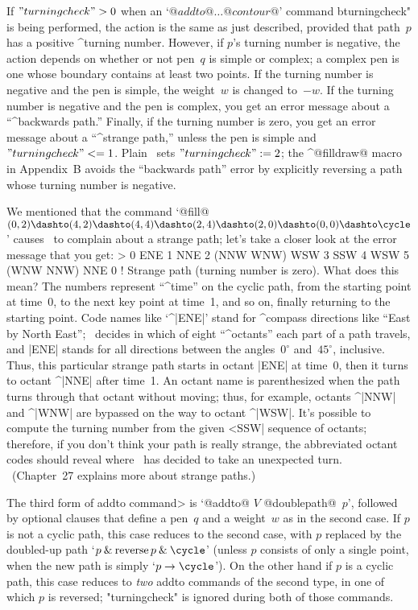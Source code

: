 {{{{\ddanger If $"turningcheck">0$ when an `$@addto@\ldots@contour@$' command
^^"turningcheck" is being performed, the action is the same as just
described, provided that path~$p$ has a positive ^{turning number}.
However, if $p$'s turning number is negative, the action depends on
whether or not pen~$q$ is simple or complex; a complex pen is one whose
boundary contains at least two points. If the turning number is negative
and the pen is simple, the weight~$w$ is changed to~$-w$. If the turning
number is negative and the pen is complex, you get an error message about
a ``^{backwards path}.''  Finally, if the turning number is zero, you get
an error message about a ``^{strange path},'' unless the pen is simple and
$"turningcheck"<=1$.  Plain \MF\ sets $"turningcheck":=2$; the ^@filldraw@
macro in Appendix~B avoids the ``backwards path'' error by explicitly
reversing a path whose turning number is negative.

\danger We mentioned that the command `@fill@ $(0,2)\dashto(4,2)\dashto
(4,4)\dashto(2,4)\dashto(2,0)\dashto(0,0)\dashto\cycle$' causes \MF\
to complain about a strange path; let's take a closer look at the
error message that you get:
\begintt
> 0 ENE 1 NNE 2 (NNW WNW) WSW 3 SSW 4 WSW 5 (WNW NNW) NNE 0
! Strange path (turning number is zero).
\endtt
What does this mean? The numbers represent ``^time'' on the cyclic path,
from the starting point at time~0, to the next key point at time~1,
and so on, finally returning to the starting point. Code names like
`^|ENE|' stand for ^{compass directions} like ``East by North East'';
\MF\ decides in which of eight ``^{octants}'' each part of a path travels,
and |ENE| stands for all directions between the angles~$0^\circ$
and~$45^\circ$, inclusive.  Thus, this particular strange path starts in
octant |ENE| at time~0, then it turns to octant ^|NNE| after time~1.
An octant name is parenthesized when the path turns through that octant
without moving; thus, for example, octants ^|NNW| and ^|WNW| are bypassed
on the way to octant ^|WSW|. It's possible to compute the turning number
from the given ^^|SSW| sequence of octants; therefore, if you don't think
your path is really strange, the abbreviated octant codes should reveal
where \MF\ has decided to take an unexpected turn. \ (Chapter~27 explains
more about strange paths.)

\ddanger The third form of \<addto command> is `@addto@ $V$ @doublepath@~$p$',
followed by optional clauses that define a pen~$q$ and a weight~$w$ as in
the second case. If $p$ is not a cyclic path, this case reduces to the
second case, with $p$ replaced by the doubled-up path
`$p\mathbin{\&}\mathop{\rm reverse}p \mathbin{\&}\cycle$' (unless $p$
consists of only a single point, when the new path is simply
`$p\to\cycle$'\thinspace). On the other hand if $p$ is a cyclic
path, this case reduces to {\sl two\/} addto commands of the second type,
in one of which $p$ is reversed; "turningcheck" is ignored during both of
those commands.

}}}}
